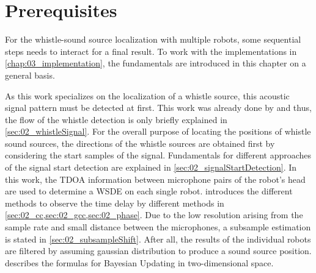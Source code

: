 \chapter{Prerequisites}
\label{chap:02_prerequisites}

For the whistle-sound source localization with multiple robots, some
sequential steps needs to interact for a final result.
To work with the implementations in \cref{chap:03_implementation}, the fundamentals
are introduced in this chapter on a general basis.

As this work specializes on the localization of a whistle source, this acoustic
signal pattern must be detected at first.
This work was already done by \cite{Hasselbring} and thus,
the flow of the whistle detection is only briefly explained in \cref{sec:02_whistleSignal}.
For the overall purpose of locating the positions of whistle sound sources,
the directions of the whistle sources are obtained first by considering the
start samples of the signal.
Fundamentals for different approaches of the signal start detection are
explained in \cref{sec:02_signalStartDetection}.
In this work, the \ac{TDOA} information between microphone pairs of the robot's
head are used to determine a \acf{WSDE} on each single robot.
 introduces the different methods to observe the time delay
by different methods in \cref{sec:02_cc,sec:02_gcc,sec:02_phase}.
Due to the low resolution arising from the sample rate and small distance between the microphones,
a subsample estimation is stated in \cref{sec:02_subsampleShift}.
After all, the results of the individual robots are filtered by assuming
gaussian distribution to produce a sound source position.
 describes the formulas for Bayesian Updating in two-dimensional space.









